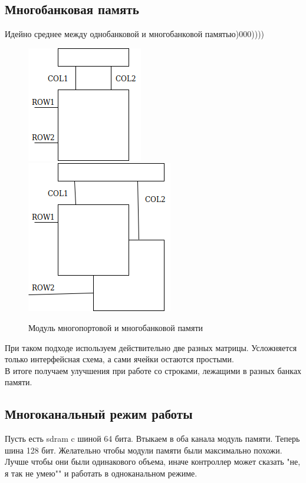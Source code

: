 \documentclass[12pt, a4paper]{article}
\begin{document}
\subsection{Многобанковая память}
Идейно среднее между однобанковой и многобанковой памятью)000))))\\
\begin{figure}[h]
    \centering
    \includegraphics[scale=0.45]{./images/MultiportMEM.png}
    \includegraphics[scale=0.45]{./images/MultibankMEM.png}
    \caption{Модуль многопортовой и многобанковой памяти}
    \label{fig:MultiportMEM}
\end{figure}
При таком подходе используем действительно две разных матрицы. Усложняется только интерфейсная схема, а сами ячейки остаются простыми.\\
В итоге получаем улучшения при работе со строками, лежащими в разных банках памяти.
\subsection{Многоканальный режим работы}
Пусть есть sdram c шиной 64 бита.
Втыкаем в оба канала модуль памяти. Теперь шина 128 бит.
Желательно чтобы модули памяти были максимально похожи. Лучше чтобы они были одинакового объема, иначе контроллер может сказать "не, я так не умею"" и работать в одноканальном режиме. 
\end{document}
